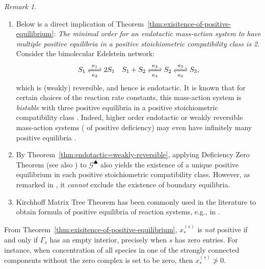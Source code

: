 \documentclass[10pt]{amsart}
\numberwithin{equation}{section}
\theoremstyle{plain}
\theoremstyle{definition}
\theoremstyle{remark}
\newtheorem{remark}[theorem]{Remark}
\newcommand{\cG}{\mathcal{G}}
\newcommand\red[1]{\textcolor{red}{#1}}
\begin{document}
\begin{remark}\label{re:positive-equilibrium}
\begin{enumerate}
\item[(i)] Below is a direct implication of Theorem~\ref{thm:exisitence-of-positive-equilibrium}:  \emph{The minimal order for an endotactic mass-action system to have multiple positive equilibria in a positive stoichiometric compatibility class is 2}. Consider the bimolecular Edelstein network:
\[S_1\ce{<=>[\kappa_1][\kappa_2]}2S_1\quad S_1+S_2\ce{<=>[\kappa_3][\kappa_4]}S_2\ce{<=>[\kappa_5][\kappa_6]}S_3,\]
which is (weakly) reversible, and hence is endotactic. It is known that for certain choices of the reaction rate constants, this mass-action system is \emph{bistable} with three positive equilibria in a positive stoichiometric compatibility class  \cite[Example~3.C.3]{F79}. Indeed, higher order endotactic  or weakly reversible mass-action systems ( of positive deficiency)  may even have infinitely many positive equilibria \cite{BCY20,KD23}.
\item[(ii)] By Theorem~\ref{thm:endotactic=weakly-reversible}, applying Deficiency Zero Theorem \cite[Theorem~6.1.1]{F87} (see also \cite{HJ72,FH77}) to $\cG^{\spadesuit}$ also yields the existence of a unique positive equilibrium in each positive  stoichiometric compatibility class. However, as remarked in \cite{F87}, it \emph{cannot} exclude the existence of boundary equilibria.
\item[(iii)] Kirchhoff Matrix Tree Theorem has been commonly used in the literature to obtain formula of positive equilibria of reaction systems, e.g., in \cite{CDSS09}.
\end{enumerate}
\end{remark}


From Theorem~\ref{thm:exisitence-of-positive-equilibrium}, $x_*^{(s)}$ is \emph{not} positive if and only if $\Gamma_s$ has an empty interior, precisely when $s$ has zero entries.
 For instance, when concentration of all species in one of the strongly connected components without the zero complex is set to be zero, then $x_*^{(s)}\not>0$.
\end{document}
